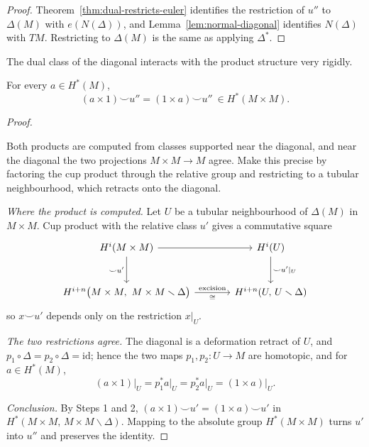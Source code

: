 \begin{proof}
Theorem~\ref{thm:dual-restricts-euler} identifies the restriction of $u''$ to
$\Delta(M)$ with $e(N(\Delta))$, and
Lemma~\ref{lem:normal-diagonal} identifies $N(\Delta)$ with $TM$. Restricting
to $\Delta(M)$ is the same as applying $\Delta^*$.
\end{proof}

The dual class of the diagonal interacts with the product structure very
rigidly.

\begin{lemma}\label{lem:ax1}
For every $a\in H^*(M)$,
\[
(a\times1)\smile u''=(1\times a)\smile u''\ \in H^*(M\times M).
\]
\end{lemma}

\begin{proof}
\begin{strategy}
Both products are computed from classes supported near the diagonal, and near
the diagonal the two projections $M\times M\to M$ agree. Make this precise by
factoring the cup product through the relative group and restricting to a
tubular neighbourhood, which retracts onto the diagonal.
\end{strategy}

 \emph{Where the product is computed.} Let $U$ be a tubular
neighbourhood of $\Delta(M)$ in $M\times M$. Cup product with the relative class
$u'$ gives a commutative square
\[
\begin{tikzcd}[row sep=large, column sep=large]
H^i(M\times M)\arrow[r]\arrow[d,"\smile u'"'] & H^i(U)\arrow[d,"\smile u'|_U"]\\
H^{i+n}\big(M\times M,\ M\times M\smallsetminus\Delta\big)
\arrow[r,"\iso"',"\text{excision}"] & H^{i+n}(U,\,U\smallsetminus\Delta)
\end{tikzcd}
\]
so $x\smile u'$ depends only on the restriction $x|_U$.

 \emph{The two restrictions agree.} The diagonal is a deformation
retract of $U$, and $p_1\circ\Delta=p_2\circ\Delta=\mathrm{id}$; hence the two
maps $p_1,p_2\colon U\to M$ are homotopic, and for $a\in H^*(M)$,
\[
(a\times1)\big|_U=p_1^*a\big|_U=p_2^*a\big|_U=(1\times a)\big|_U .
\]

 \emph{Conclusion.} By Steps 1 and 2,
$(a\times1)\smile u'=(1\times a)\smile u'$ in
$H^*(M\times M,\,M\times M\smallsetminus\Delta)$. Mapping to the absolute group
$H^*(M\times M)$ turns $u'$ into $u''$ and preserves the identity.
\end{proof}

